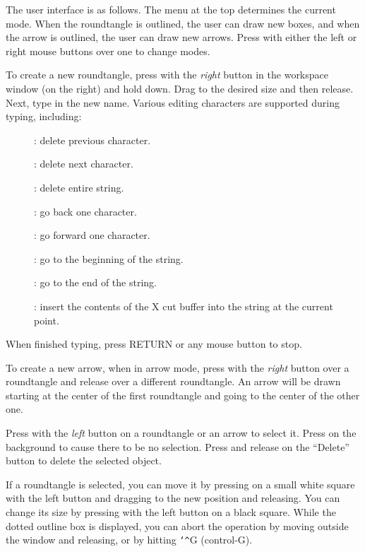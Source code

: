 The user interface is as follows.  The menu at the top determines the
current mode.  When the roundtangle is outlined, the user can draw new
boxes, and when the arrow is outlined, the user can draw new arrows.
Press with either the left or right mouse buttons over one to change modes.

To create a new roundtangle, press with the {\it right} button in the
workspace window (on the right) and hold down.  Drag to the desired size
and then release.  Next, type in the new name.  Various editing characters
are supported during typing, including:
\begin{description}
\item[] : delete previous character.

\item[] : delete next character.

\item[] : delete entire string.

\item[] : go back one character.

\item[] : go forward one character.

\item[] : go to the beginning of the string.

\item[] : go to the end of the string.

\item[] : insert the contents of the X cut buffer into the string at the
current point.
\end{description}
When finished typing, press RETURN or any mouse button to stop.

To create a new arrow, when in arrow mode, press with the {\it right} button over
a roundtangle and release over a different roundtangle.  An arrow will be
drawn starting at the center of the first roundtangle and going to the
center of the other one.

Press with the {\it left} button on a roundtangle or an arrow to select it.
Press on the background to cause there to be no selection.  Press and
release on the ``Delete'' button to delete the selected object.

If a roundtangle is selected, you can move it by pressing on a small white
square with the left button and dragging to the new position and releasing.
You can change its size by pressing with the left button on a black square.
While the dotted outline box is displayed, you can abort the operation by
moving outside the window and releasing, or by hitting {\tt\char`\^}G (control-G).

